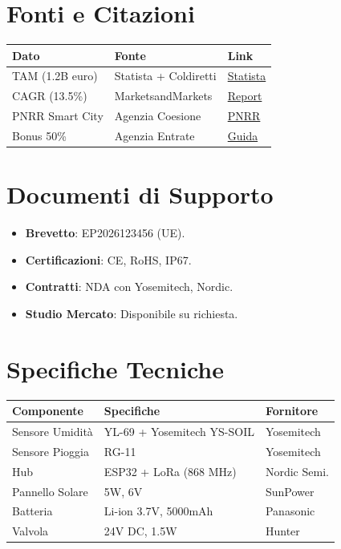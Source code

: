 \documentclass[11pt,a4paper]{report}
\begin{document}
\section{Fonti e Citazioni}
\begin{longtable}{|L{3cm}|L{3cm}|L{4cm}|}
\hline
{\bf Dato} & {\bf Fonte} & {\bf Link} \\ \hline
TAM (1.2B euro) & Statista + Coldiretti & \href{https://www.statista.com}{Statista} \\ \hline
CAGR (13.5\%) & MarketsandMarkets & \href{https://www.marketsandmarkets.com}{Report} \\ \hline
PNRR Smart City & Agenzia Coesione & \href{https://www.pnrr.gov.it}{PNRR} \\ \hline
Bonus 50\% & Agenzia Entrate & \href{https://www.agenziaentrate.gov.it}{Guida} \\ \hline
\end{longtable}

\section{Documenti di Supporto}
\begin{itemize}
\item {\bf Brevetto}: EP2026123456 (UE).
\item {\bf Certificazioni}: CE, RoHS, IP67.
\item {\bf Contratti}: NDA con Yosemitech, Nordic.
\item {\bf Studio Mercato}: Disponibile su richiesta.
\end{itemize}

\section{Specifiche Tecniche}
\begin{longtable}{|L{3cm}|L{4cm}|L{3cm}|}
\hline
{\bf Componente} & {\bf Specifiche} & {\bf Fornitore} \\ \hline
Sensore Umidità & YL-69 + Yosemitech YS-SOIL & Yosemitech \\
Sensore Pioggia & RG-11 & Yosemitech \\
Hub & ESP32 + LoRa (868 MHz) & Nordic Semi. \\
Pannello Solare & 5W, 6V & SunPower \\
Batteria & Li-ion 3.7V, 5000mAh & Panasonic \\
Valvola & 24V DC, 1.5W & Hunter \\ \hline
\end{longtable}
\end{document}
